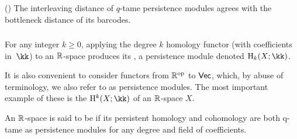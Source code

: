 \medskip\theorem(\cite[Thm.~5.14]{chazal2016stability})
The interleaving distance of $q$-tame persistence modules agrees with the bottleneck distance of its barcodes.



\subsubsection{}
For any integer $k \geq 0$, applying the degree $k$ homology functor (with coefficients in~$\kk$) to an $\R$-space produces its , a persistence module denoted $\rH_k(X; \kk)$.

It is also convenient to consider functors from $\R^\op$ to $\Vec$, which, by abuse of terminology, we also refer to as persistence modules.
The most important example of these is the  $\rH^k(X; \kk)$ of an $\R$-space $X$.

An $\R$-space is said to be  if its persistent homology and cohomology are both q-tame as persistence modules for any degree and field of coefficients.


